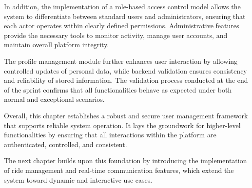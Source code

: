 In addition, the implementation of a role-based access control model allows the system to differentiate between standard users and administrators, ensuring that each actor operates within clearly defined permissions. Administrative features provide the necessary tools to monitor activity, manage user accounts, and maintain overall platform integrity.

The profile management module further enhances user interaction by allowing controlled updates of personal data, while backend validation ensures consistency and reliability of stored information. The validation process conducted at the end of the sprint confirms that all functionalities behave as expected under both normal and exceptional scenarios.

Overall, this chapter establishes a robust and secure user management framework that supports reliable system operation. It lays the groundwork for higher-level functionalities by ensuring that all interactions within the platform are authenticated, controlled, and consistent.

The next chapter builds upon this foundation by introducing the implementation of ride management and real-time communication features, which extend the system toward dynamic and interactive use cases.